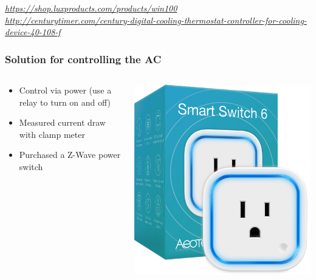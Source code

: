 \documentclass[aspectratio=169,11pt,hyperref={colorlinks=true}]{beamer}
\begin{document}
\begin{frame}
\begin{columns}
\begin{column}{.48\textwidth}
\begin{center}
            \end{center}
        \end{column}
    \end{columns}
    \footnotesize
    \textit{\href{https://shop.luxproducts.com/products/win100}{https://shop.luxproducts.com/products/win100}\\
    \href{http://centurytimer.com/century-digital-cooling-thermostat-controller-for-cooling-device-40-108-f}{http://centurytimer.com/century-digital-cooling-thermostat-controller-for-cooling-device-40-108-f}}
\end{frame}

\begin{frame}
    \frametitle{Solution for controlling the AC}
    \begin{columns}
        \begin{column}{.48\textwidth}
            \begin{itemize}
                \item Control via power (use a relay to turn on and off)
                \item Measured current draw with clamp meter
                \item Purchased a Z-Wave power switch
            \end{itemize}
        \end{column}
        \begin{column}{.48\textwidth}
            \includegraphics[width=.8\textwidth]{aeotec-ss6.jpg}
        \end{column}
    \end{columns}
\end{frame}
\end{document}
